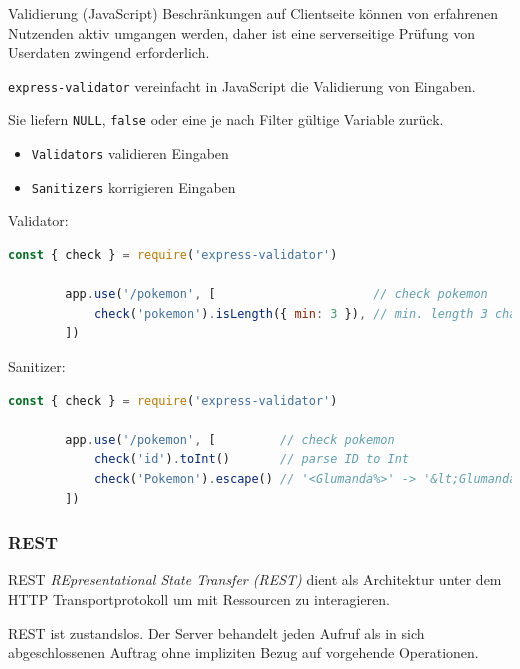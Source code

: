 \begin{defi}{Validierung (JavaScript)}
    Beschränkungen auf Clientseite können von erfahrenen Nutzenden aktiv umgangen werden, daher ist eine serverseitige Prüfung von Userdaten zwingend erforderlich.

    \texttt{express-validator} vereinfacht in JavaScript die Validierung von Eingaben.

    Sie liefern \texttt{NULL}, \texttt{false} oder eine je nach Filter gültige Variable zurück.

    \begin{itemize}
        \item \texttt{Validators} validieren Eingaben
        \item \texttt{Sanitizers} korrigieren Eingaben
    \end{itemize}

    Validator:
    \begin{lstlisting}[language=JavaScript]
        const { check } = require('express-validator')

        app.use('/pokemon', [                      // check pokemon
            check('pokemon').isLength({ min: 3 }), // min. length 3 chars (z. B. Mew)
        ])
    \end{lstlisting}

    Sanitizer:
    \begin{lstlisting}[language=JavaScript]
        const { check } = require('express-validator')

        app.use('/pokemon', [         // check pokemon
            check('id').toInt()       // parse ID to Int
            check('Pokemon').escape() // '<Glumanda%>' -> '&lt;Glumanda%&gt;'
        ])
    \end{lstlisting}
\end{defi}

\subsubsection{REST}

\begin{defi}{REST}
    \emph{REpresentational State Transfer (REST)} dient als Architektur unter dem HTTP Transportprotokoll um mit Ressourcen zu interagieren.

    REST ist zustandslos.
    Der Server behandelt jeden Aufruf als in sich abgeschlossenen Auftrag ohne impliziten Bezug auf vorgehende Operationen.
\end{defi}

